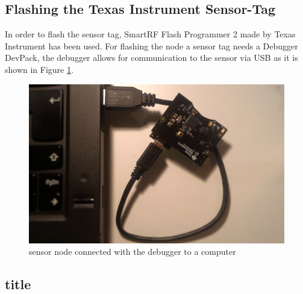\subsection{Flashing the Texas Instrument Sensor-Tag} 
In order to flash the sensor tag, SmartRF Flash Programmer 2 made by Texas Instrument has been used. For flashing the node a sensor tag needs a Debugger DevPack, the debugger allows for communication to the sensor via USB as it is shown in Figure \ref{fig:debug}.  
\begin{figure}[!h]
	\begin{center}
		\includegraphics[width=0.8\linewidth]{debugger}
		\caption{sensor node connected with the debugger to a computer}
		\label{fig:debug}
	\end{center}
	
\end{figure} 

\subsection{title}